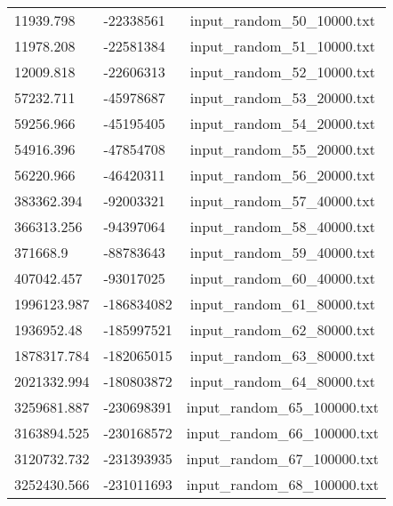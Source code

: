 \begin{longtable}[hb]{|l|l|c|}
    11939.798 & -22338561 & input\_random\_50\_10000.txt \\
    11978.208 & -22581384 & input\_random\_51\_10000.txt \\
    12009.818 & -22606313 & input\_random\_52\_10000.txt \\
    57232.711 & -45978687 & input\_random\_53\_20000.txt \\
    59256.966 & -45195405 & input\_random\_54\_20000.txt \\
    54916.396 & -47854708 & input\_random\_55\_20000.txt \\
    56220.966 & -46420311 & input\_random\_56\_20000.txt \\
    383362.394 & -92003321 & input\_random\_57\_40000.txt \\
    366313.256 & -94397064 & input\_random\_58\_40000.txt \\
    371668.9 & -88783643 & input\_random\_59\_40000.txt \\
    407042.457 & -93017025 & input\_random\_60\_40000.txt \\
    1996123.987 & -186834082 & input\_random\_61\_80000.txt \\
    1936952.48 & -185997521 & input\_random\_62\_80000.txt \\
    1878317.784 & -182065015 & input\_random\_63\_80000.txt \\
    2021332.994 & -180803872 & input\_random\_64\_80000.txt \\
    3259681.887 & -230698391 & input\_random\_65\_100000.txt \\
    3163894.525 & -230168572 & input\_random\_66\_100000.txt \\
    3120732.732 & -231393935 & input\_random\_67\_100000.txt \\
    3252430.566 & -231011693 & input\_random\_68\_100000.txt \\
    \hline
\end{longtable}